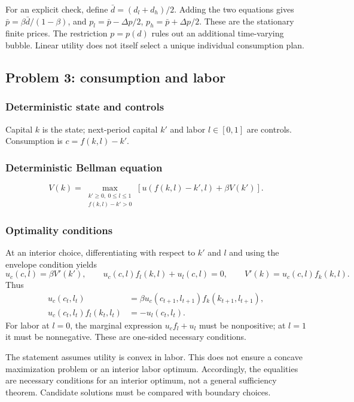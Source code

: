 For an explicit check, define $\bar d=(d_l+d_h)/2$. Adding the two equations gives $\bar p=\beta\bar d/(1-\beta)$, and $p_l=\bar p-\Delta p/2$, $p_h=\bar p+\Delta p/2$. These are the stationary finite prices. The restriction $p=p(d)$ rules out an additional time-varying bubble. Linear utility does not itself select a unique individual consumption plan.

\subsection*{Problem 3: consumption and labor}
\setcounter{subsubsection}{0}
\subsubsection{Deterministic state and controls}
Capital $k$ is the state; next-period capital $k'$ and labor $l\in[0,1]$ are controls. Consumption is $c=f(k,l)-k'$.

\subsubsection{Deterministic Bellman equation}
\[
V(k)=\max_{\substack{k'\geq0,\ 0\leq l\leq1\\ f(k,l)-k'>0}}
\left[u(f(k,l)-k',l)+\beta V(k')\right].
\]

\subsubsection{Optimality conditions}
At an interior choice, differentiating with respect to $k'$ and $l$ and using the envelope condition yields
\[
u_c(c,l)=\beta V'(k'),\qquad
u_c(c,l)f_l(k,l)+u_l(c,l)=0,\qquad
V'(k)=u_c(c,l)f_k(k,l).
\]
Thus
\[
\begin{aligned}
u_c(c_t,l_t)&=\beta u_c(c_{t+1},l_{t+1})f_k(k_{t+1},l_{t+1}),\\
u_c(c_t,l_t)f_l(k_t,l_t)&=-u_l(c_t,l_t).
\end{aligned}
\]
For labor at $l=0$, the marginal expression $u_cf_l+u_l$ must be nonpositive; at $l=1$ it must be nonnegative. These are one-sided necessary conditions.

The statement assumes utility is convex in labor. This does not ensure a concave maximization problem or an interior labor optimum. Accordingly, the equalities are necessary conditions for an interior optimum, not a general sufficiency theorem. Candidate solutions must be compared with boundary choices.

